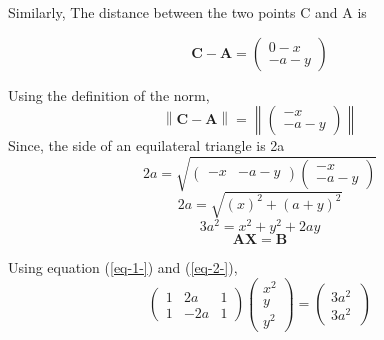 \documentclass[journal,12pt,twocolumn]{IEEEtran}
\providecommand{\norm}[1]{\left\lVert#1\right\rVert}
\let\vec\mathbf
\newcommand{\myvec}[1]{\ensuremath{\begin{pmatrix}#1\end{pmatrix}}}
\begin{document}
\noindent Similarly, The distance between the two points C and A is

\begin{equation}	
\vec{C}-\vec{A} = \myvec{0-x \\ -a-y}
\end{equation}

\noindent Using the definition   of the norm, 
		\begin{equation}
\norm{\vec{C}-\vec{A}} =\norm{\myvec{-x \\ -a-y}}
\end{equation}
\noindent Since, the side of an equilateral triangle is 2a	
\begin{equation}						
			2a=\sqrt{\myvec{-x & -a-y}\myvec{-x \\ -a-y}} 
\end{equation}
\begin{equation}						
2a =  \sqrt{(x)^2+ (a+y)^2}
\end{equation}
\begin{equation}
3a^2 = {x^2+y^2+2ay}
\label{eq-2-}
\end{equation}
\begin{equation}
\vec{AX} = \vec{B}
\end{equation}


Using equation (\ref{eq-1-}) and (\ref{eq-2-}),
\begin{equation}
  \begin{pmatrix}
1 & 2a & 1\\
1 & -2a & 1
\end{pmatrix} 
\begin{pmatrix}
x^2\\
y\\
y^2
\end{pmatrix} 
=
\begin{pmatrix}
3a^2 \\ 
3a^2\
\end{pmatrix}
\end{equation} 
\end{document}
